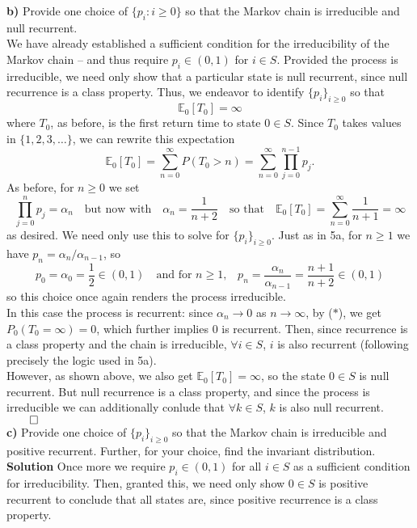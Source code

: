 \documentclass[11pt, letterpaper]{article}
\newcommand{\mbb}[1]{\mathbb{#1}}
\begin{document}
    {\bf b)} Provide one choice of $\{p_i:i\geq 0\}$ so that the Markov chain is irreducible and null recurrent.\\[10pt]
    We have already established a sufficient condition for the irreducibility of the Markov chain -- and thus require $p_i\in(0,1)$ for $i\in S$. Provided the process is irreducible, we need only show that a particular state is null recurrent, since
    null recurrence is a class property. Thus, we endeavor to identify $\{p_i\}_{i\geq 0}$ so that
    \[\mbb{E}_0\left[T_0\right]=\infty\]
    where $T_0$, as before, is the first return time to state $0\in S$. Since $T_0$ takes values in $\{1,2,3,\dots\}$, we can rewrite this expectation
    \[\mbb{E}_0\left[T_0\right]=\sum_{n=0}^\infty P(T_0>n)=\sum_{n=0}^\infty\prod_{j=0}^{n-1}p_j.\]
    As before, for $n\geq 0$ we set
    \[\prod_{j=0}^np_j=\alpha_n\quad\text{but now with}\quad\alpha_{n}=\frac{1}{n+2}\quad\text{so that}\quad\mbb{E}_0\left[T_0\right]=\sum_{n=0}^\infty\frac{1}{n+1}=\infty\]
    as desired. We need only use this to solve for $\{p_i\}_{i\geq 0}$. Just as in 5a, for $n\geq 1$ we have $p_n=\alpha_n/\alpha_{n-1}$, so
    \[p_0=\alpha_0=\frac{1}{2}\in(0,1)\quad\text{and for $n\geq 1$,}\quad p_n=\frac{\alpha_n}{\alpha_{n-1}}=\frac{n+1}{n+2}\in(0,1)\]
    so this choice once again renders the process irreducible.\\[10pt]
    In this case the process is recurrent: since $\alpha_n\rightarrow 0$ as $n\rightarrow\infty$, by ($\ast$), we get $P_0(T_0=\infty)=0$, which further implies $0$ is recurrent. Then, since recurrence is a class property and the chain is irreducible, $\forall i\in S$, $i$ is also recurrent (following precisely the logic used in 5a).\\[10pt]
    However, as shown above, we also get $\mbb{E}_0\left[T_0\right]=\infty$, so the state $0\in S$ is null recurrent. But null recurrence is a class property, and since the process is irreducible we can additionally conlude that $\forall k\in S$, $k$ is also null recurrent.\hfill{$\qed$}\\[10pt]
    {\bf c)} Provide one choice of $\{p_i\}_{i\geq 0}$ so that the Markov chain is irreducible and positive recurrent. Further, for your choice, find the invariant distribution.\\[10pt]
    {\bf Solution} Once more we require $p_i\in(0,1)$ for all $i\in S$ as a sufficient condition for irreducibility. Then, granted this, we need only show $0\in S$ is positive recurrent to conclude that all states are, since positive recurrence is a class property.\\[10pt]
\end{document}
